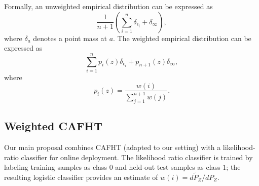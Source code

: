 \documentclass{article}
\numberwithin{equation}{section}
\begin{document}
Formally, an unweighted empirical distribution can be expressed as
\begin{equation} \label{eq:2}
\frac{1}{n+1} \left( \sum^n_{i=1} \delta_{\epsilon_i} + \delta_\infty \right),
\end{equation}
where $\delta_a$ denotes a point mass at $a$. The weighted empirical distribution can be expressed as
\begin{equation} \label{eq:3}
\sum^n_{i=1} p_i(z) \delta_{\epsilon_i} + p_{n+1}(z) \delta_\infty,
\end{equation}
where
\begin{equation} \label{eq:4}
p_i(z) = \frac{w(i)}{\sum_{j=1}^{n+1} w(j)}.
\end{equation}

\subsection{Weighted CAFHT}

Our main proposal combines CAFHT (adapted to our setting) with a likelihood-ratio classifier for online deployment. The likelihood ratio classifier is trained by labeling training samples as class $0$ and held-out test samples as class $1$; the resulting logistic classifier provides an estimate of $w(i) = d\widetilde{P}_Z / dP_Z$.
\end{document}
